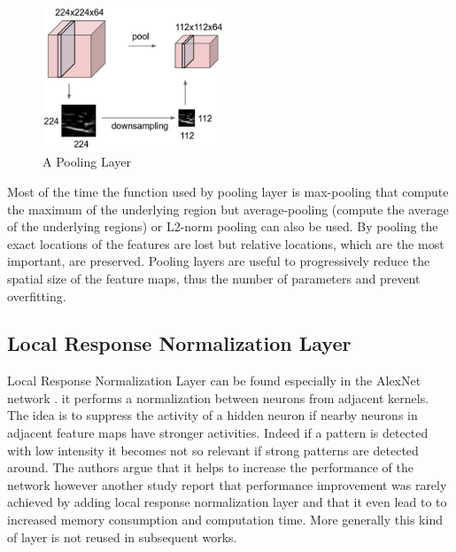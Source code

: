     \begin{figure}
      \begin{center}
        \includegraphics[width=0.48\textwidth]{images/pool_layer.jpeg}
      \end{center}
      \caption{A Pooling Layer}
    \end{figure}

    Most of the time the function used by pooling layer is max-pooling that compute the maximum of the underlying region but average-pooling (compute the average of the underlying regions) or L2-norm pooling can also be used. By pooling the exact locations of the features are lost but relative locations, which are the most important, are preserved. Pooling layers are useful to progressively reduce the spatial size of the feature maps, thus the number of parameters and prevent overfitting. \\

    \subsection{Local Response Normalization Layer}

    Local Response Normalization Layer can be found especially in the AlexNet network \cite{krizhevsky2012imagenet}. it performs a normalization between neurons from adjacent kernels. The idea is to suppress the activity of a hidden neuron if nearby neurons in adjacent feature maps have stronger activities. Indeed if a pattern is detected with low intensity it becomes not so relevant if strong patterns are detected around. The authors argue that it helps to increase the performance of the network however another study \cite{simonyan2014very} report that performance improvement was rarely achieved by adding local response normalization layer and that it even lead to to increased memory consumption and computation time. More generally this kind of layer is not reused in subsequent works.

